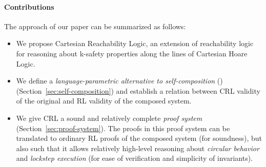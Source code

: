 \paragraph{Contributions} The approach of our paper can be summarized as follows:
\begin{itemize}
\item We propose Cartesian Reachability Logic, an extension of reachability
  logic for reasoning about k-safety properties along the lines of Cartesian
  Hoare Logic.
\item We define a \emph{language-parametric alternative to self-composition}
  (\cite{BartheDR04,DarvasHS05}) (Section~\ref{sec:self-composition}) and establish a relation between CRL validity of the
  original and RL validity of the composed system.
\item We give CRL a sound and relatively complete \emph{proof system}
  (Section~\ref{sec:proof-system}). The proofs in this proof system can be
  translated to ordinary RL proofs of the composed system (for soundness), but
  also such that it allows relatively high-level reasoning about
  \emph{circular behavior} and \emph{lockstep execution} (for ease of
  verification and simplicity of invariants).
\end{itemize}



